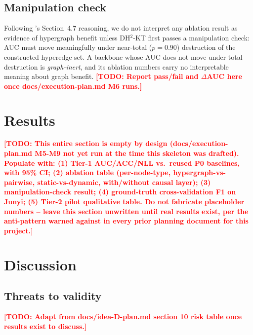 \documentclass[journal]{IEEEtran}
\newcommand{\todo}[1]{\textcolor{red}{\textbf{[TODO: #1]}}}
\begin{document}
\subsection{Manipulation check}
Following \cite{daominh2026p0}'s Section~4.7 reasoning, we do not interpret
any ablation result as evidence of hypergraph benefit unless DH$^2$-KT first
passes a manipulation check: AUC must move meaningfully under near-total
($p=0.90$) destruction of the constructed hyperedge set. A backbone whose
AUC does not move under total destruction is \emph{graph-inert}, and its
ablation numbers carry no interpretable meaning about graph benefit.
\todo{Report pass/fail and $\Delta$AUC here once
docs/execution-plan.md M6 runs.}

\label{sec:eval}

\section{Results}
\todo{This entire section is empty by design (docs/execution-plan.md
M5-M9 not yet run at the time this skeleton was drafted). Populate with:
(1) Tier-1 AUC/ACC/NLL vs.\ reused P0 baselines, with 95\% CI; (2) ablation
table (per-node-type, hypergraph-vs-pairwise, static-vs-dynamic,
with/without causal layer); (3) manipulation-check result; (4) ground-truth
cross-validation F1 on Junyi; (5) Tier-2 pilot qualitative table. Do not
fabricate placeholder numbers -- leave this section unwritten until real
results exist, per the anti-pattern warned against in every prior planning
document for this project.}

\section{Discussion}

\subsection{Threats to validity}
\todo{Adapt from docs/idea-D-plan.md section 10 risk table once results
exist to discuss.}
\end{document}
